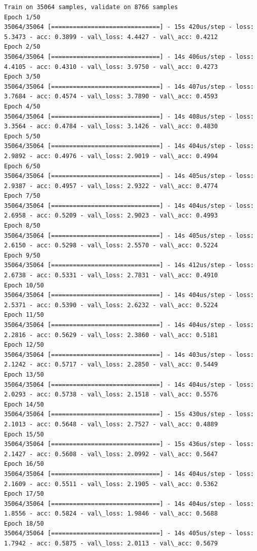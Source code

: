 \documentclass[11pt]{article}
\begin{document}
    \begin{Verbatim}[commandchars=\\\{\}]
Train on 35064 samples, validate on 8766 samples
Epoch 1/50
35064/35064 [==============================] - 15s 420us/step - loss: 5.3473 - acc: 0.3899 - val\_loss: 4.4427 - val\_acc: 0.4212
Epoch 2/50
35064/35064 [==============================] - 14s 406us/step - loss: 4.4105 - acc: 0.4310 - val\_loss: 3.9750 - val\_acc: 0.4273
Epoch 3/50
35064/35064 [==============================] - 14s 407us/step - loss: 3.7684 - acc: 0.4574 - val\_loss: 3.7890 - val\_acc: 0.4593
Epoch 4/50
35064/35064 [==============================] - 14s 408us/step - loss: 3.3564 - acc: 0.4784 - val\_loss: 3.1426 - val\_acc: 0.4830
Epoch 5/50
35064/35064 [==============================] - 14s 404us/step - loss: 2.9892 - acc: 0.4976 - val\_loss: 2.9019 - val\_acc: 0.4994
Epoch 6/50
35064/35064 [==============================] - 14s 405us/step - loss: 2.9387 - acc: 0.4957 - val\_loss: 2.9322 - val\_acc: 0.4774
Epoch 7/50
35064/35064 [==============================] - 14s 404us/step - loss: 2.6958 - acc: 0.5209 - val\_loss: 2.9023 - val\_acc: 0.4993
Epoch 8/50
35064/35064 [==============================] - 14s 405us/step - loss: 2.6150 - acc: 0.5298 - val\_loss: 2.5570 - val\_acc: 0.5224
Epoch 9/50
35064/35064 [==============================] - 14s 412us/step - loss: 2.6738 - acc: 0.5331 - val\_loss: 2.7831 - val\_acc: 0.4910
Epoch 10/50
35064/35064 [==============================] - 14s 404us/step - loss: 2.5371 - acc: 0.5390 - val\_loss: 2.6232 - val\_acc: 0.5224
Epoch 11/50
35064/35064 [==============================] - 14s 404us/step - loss: 2.2816 - acc: 0.5629 - val\_loss: 2.3860 - val\_acc: 0.5181
Epoch 12/50
35064/35064 [==============================] - 14s 403us/step - loss: 2.1242 - acc: 0.5717 - val\_loss: 2.2850 - val\_acc: 0.5449
Epoch 13/50
35064/35064 [==============================] - 14s 404us/step - loss: 2.0293 - acc: 0.5738 - val\_loss: 2.1518 - val\_acc: 0.5576
Epoch 14/50
35064/35064 [==============================] - 15s 430us/step - loss: 2.1013 - acc: 0.5648 - val\_loss: 2.7527 - val\_acc: 0.4889
Epoch 15/50
35064/35064 [==============================] - 15s 436us/step - loss: 2.1427 - acc: 0.5608 - val\_loss: 2.0992 - val\_acc: 0.5647
Epoch 16/50
35064/35064 [==============================] - 14s 404us/step - loss: 2.1609 - acc: 0.5511 - val\_loss: 2.1905 - val\_acc: 0.5362
Epoch 17/50
35064/35064 [==============================] - 14s 404us/step - loss: 1.8556 - acc: 0.5824 - val\_loss: 1.9846 - val\_acc: 0.5688
Epoch 18/50
35064/35064 [==============================] - 14s 405us/step - loss: 1.7942 - acc: 0.5875 - val\_loss: 2.0113 - val\_acc: 0.5679

\end{Verbatim}
\end{document}
